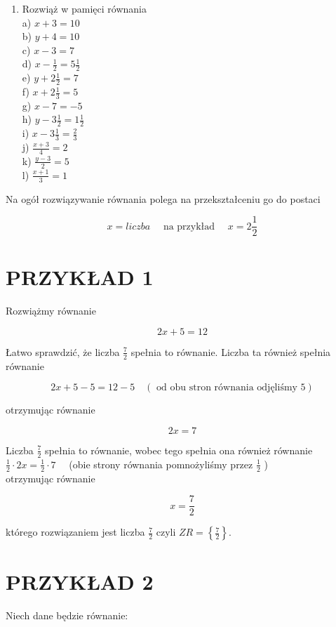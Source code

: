 \documentclass[10pt]{article}
\begin{document}
\begin{enumerate}
  \item Rozwiąż w pamięci równania\\
a) \(x+3=10\)\\
b) \(y+4=10\)\\
c) \(x-3=7\)\\
d) \(x-\frac{1}{2}=5 \frac{1}{2}\)\\
e) \(y+2 \frac{1}{2}=7\)\\
f) \(x+2 \frac{1}{3}=5\)\\
g) \(x-7=-5\)\\
h) \(y-3 \frac{1}{2}=1 \frac{1}{2}\)\\
i) \(x-3 \frac{1}{3}=\frac{2}{3}\)\\
j) \(\frac{x+3}{4}=2\)\\
k) \(\frac{y-3}{2}=5\)\\
l) \(\frac{x+1}{3}=1\)
\end{enumerate}

Na ogół rozwiązywanie równania polega na przekształceniu go do postaci

\[
x=l i c z b a \quad \text { na przykład } \quad x=2 \frac{1}{2}
\]

\section*{PRZYKŁAD 1}
Rozwiążmy równanie

\[
2 x+5=12
\]

Łatwo sprawdzić, że liczba \(\frac{7}{2}\) spełnia to równanie. Liczba ta również spełnia równanie

\[
2 x+5-5=12-5 \quad(\text { od obu stron równania odjęliśmy } 5)
\]

otrzymując równanie

\[
2 x=7
\]

Liczba \(\frac{7}{2}\) spełnia to równanie, wobec tego spełnia ona również równanie\\
\(\frac{1}{2} \cdot 2 x=\frac{1}{2} \cdot 7 \quad\) (obie strony równania pomnożyliśmy przez \(\frac{1}{2}\) )\\
otrzymując równanie

\[
x=\frac{7}{2}
\]

którego rozwiązaniem jest liczba \(\frac{7}{2}\) czyli \(Z R=\left\{\frac{7}{2}\right\}\).

\section*{PRZYKŁAD 2}
Niech dane będzie równanie:
\end{document}
